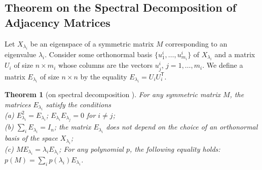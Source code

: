 \documentclass[11pt]{article}
\newtheorem{theorem}{Theorem}[section]
\theoremstyle{definition}
\begin{document}
\subsection{Theorem on the Spectral Decomposition of  Adjacency Matrices}\label{2.3}

Let $X_{\lambda_i}$ be an eigenspace of a symmetric
matrix $M$ corresponding to an eigenvalue $\lambda_i$.
Consider some orthonormal basis
$\{u^i_1,\dots,u^i_{m_i}\}$ of $X_{\lambda_i}$ and a matrix
$U_i$ of size $n\times m_i$ whose columns are the vectors
$u^i_j$, $j=1,\dots,m_i$. We define a matrix $E_{\lambda_i}$ of size
$n\times n$ by the equality $E_{\lambda_i}=U_i U_i^{\mathsf T}$.

\begin{theorem}[on spectral decomposition \cite{Godsil}]
For any symmetric matrix $M$, the matrices $E_{\lambda_i}$
satisfy the conditions \\
{\rm (a)} $E^2_{\lambda_i}=E_{\lambda_i}$; $E_{\lambda_i}E_{\lambda_j}=0$
for $i\neq j$;\\
{\rm (b)} $\sum_iE_{\lambda_i}=I_n$; the matrix $E_{\lambda_i}$ does not depend on the choice of an orthonormal basis
of the space $X_{\lambda_i}$;\\
{\rm (c)} $ME_{\lambda_i}=\lambda_iE_{\lambda_i}$; For any polynomial
$p$, the following equality holds:\\
$p(M)=\sum_ip(\lambda_i)E_{\lambda_i}$.
\end{theorem}
\end{document}
